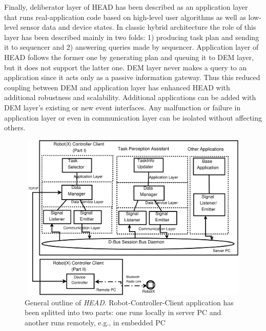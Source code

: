 \documentclass{ifacconf}
\begin{document}
Finally, deliberator layer of HEAD has been described as an application layer that runs real-application code based on high-level user algorithms as well as low-level sensor data and device states. In classic hybrid architecture the role of this layer has been described mainly in two folds: 1) producing task plan and sending it to sequencer and 2) answering queries made by sequencer. Application layer of HEAD follows the former one by generating plan and queuing it to DEM layer, but it does not support the latter one. DEM layer never makes a query to an application since it acts only as a passive information gateway. Thus this reduced coupling between DEM and application layer has enhanced HEAD with additional robustness and scalability. Additional applications can be added with DEM layer's existing or new event interfaces. Any malfunction or failure in application layer or even in communication layer can be isolated without affecting others. 
\begin{figure}
\begin{center}
\includegraphics[width=12cm,height=8cm]{./dia-files/concrete-arch} %
\caption{General outline of {\em HEAD}. Robot-Controller-Client application has been splitted into two parts: one runs locally in server PC and another runs remotely, e.g., in embedded PC} 
\label{fig:concrete-arch}
\end{center}
\end{figure}
\end{document}
